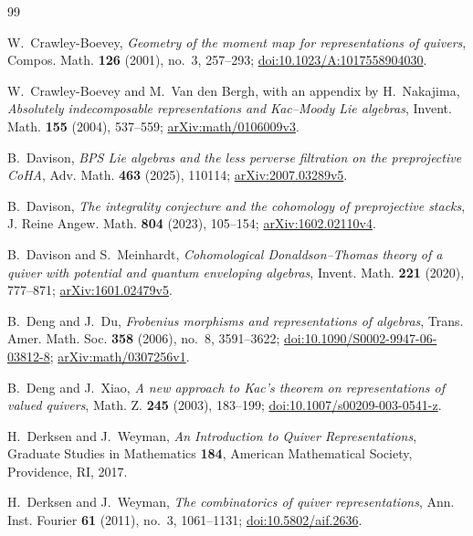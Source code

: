 \documentclass[11pt, reqno]{amsart}
\numberwithin{equation}{section}
\theoremstyle{definition}
\theoremstyle{remark}
\begin{document}
\begin{thebibliography}{99}

W.~Crawley-Boevey,
\emph{Geometry of the moment map for representations of quivers},
Compos. Math. \textbf{126} (2001), no.~3, 257--293;
\href{https://doi.org/10.1023/A:1017558904030}{doi:10.1023/A:1017558904030}.

W.~Crawley-Boevey and M.~Van den Bergh, with an appendix by H.~Nakajima,
\emph{Absolutely indecomposable representations and Kac--Moody Lie
algebras}, Invent. Math. \textbf{155} (2004), 537--559;
\href{https://arxiv.org/abs/math/0106009v3}{arXiv:math/0106009v3}.

B.~Davison,
\emph{BPS Lie algebras and the less perverse filtration on the
preprojective CoHA}, Adv. Math. \textbf{463} (2025), 110114;
\href{https://arxiv.org/abs/2007.03289v5}{arXiv:2007.03289v5}.

B.~Davison,
\emph{The integrality conjecture and the cohomology of preprojective
stacks}, J. Reine Angew. Math. \textbf{804} (2023), 105--154;
\href{https://arxiv.org/abs/1602.02110v4}{arXiv:1602.02110v4}.

B.~Davison and S.~Meinhardt,
\emph{Cohomological Donaldson--Thomas theory of a quiver with potential
and quantum enveloping algebras}, Invent. Math. \textbf{221} (2020),
777--871; \href{https://arxiv.org/abs/1601.02479v5}{arXiv:1601.02479v5}.

B.~Deng and J.~Du,
\emph{Frobenius morphisms and representations of algebras},
Trans. Amer. Math. Soc. \textbf{358} (2006), no.~8, 3591--3622;
\href{https://doi.org/10.1090/S0002-9947-06-03812-8}{doi:10.1090/S0002-9947-06-03812-8};
\href{https://arxiv.org/abs/math/0307256v1}{arXiv:math/0307256v1}.

B.~Deng and J.~Xiao,
\emph{A new approach to Kac's theorem on representations of valued
quivers}, Math. Z. \textbf{245} (2003), 183--199;
\href{https://doi.org/10.1007/s00209-003-0541-z}{doi:10.1007/s00209-003-0541-z}.

H.~Derksen and J.~Weyman,
\emph{An Introduction to Quiver Representations}, Graduate Studies in
Mathematics \textbf{184}, American Mathematical Society, Providence,
RI, 2017.


H.~Derksen and J.~Weyman,
\emph{The combinatorics of quiver representations},
Ann. Inst. Fourier \textbf{61} (2011), no.~3, 1061--1131;
\href{https://doi.org/10.5802/aif.2636}{doi:10.5802/aif.2636}.



\end{thebibliography}
\end{document}
